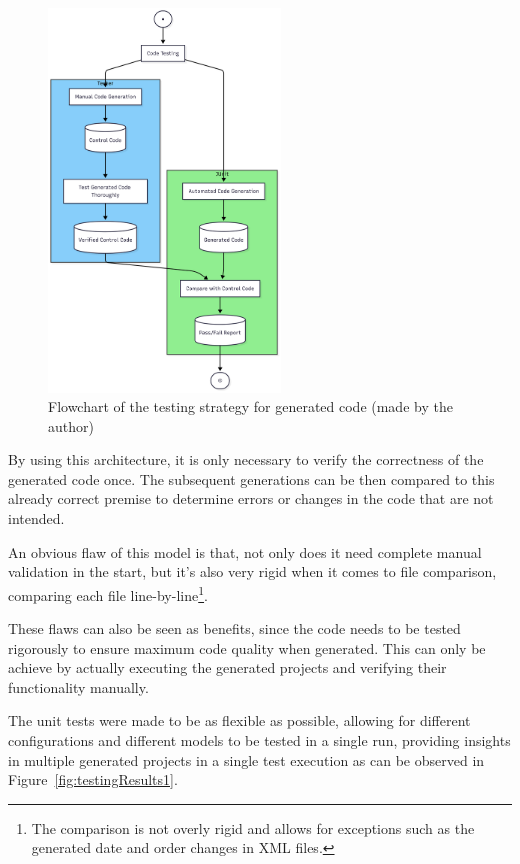 \begin{figure}[htbp]
	\centering
	\includegraphics[width=0.55\textwidth]{testingFlowchart.png}
	\caption{Flowchart of the testing strategy for generated code (made by the author)}
	\label{fig:testingFlowchart}
\end{figure}

By using this architecture, it is only necessary to verify the correctness of the generated code once. The subsequent generations can be then compared to this already correct premise to determine errors or changes in the code that are not intended.

An obvious flaw of this model is that, not only does it need complete manual validation in the start, but it's also very rigid when it comes to file comparison, comparing each file line-by-line\footnote{The comparison is not overly rigid and allows for exceptions such as the generated date and order changes in \gls{XML} files.}.

These flaws can also be seen as benefits, since the code needs to be tested rigorously to ensure maximum code quality when generated. This can only be achieve by actually executing the generated projects and verifying their functionality manually.

The unit tests were made to be as flexible as possible, allowing for different configurations and different models to be tested in a single run, providing insights in multiple generated projects in a single test execution as can be observed in Figure~\ref{fig:testingResults1}.

